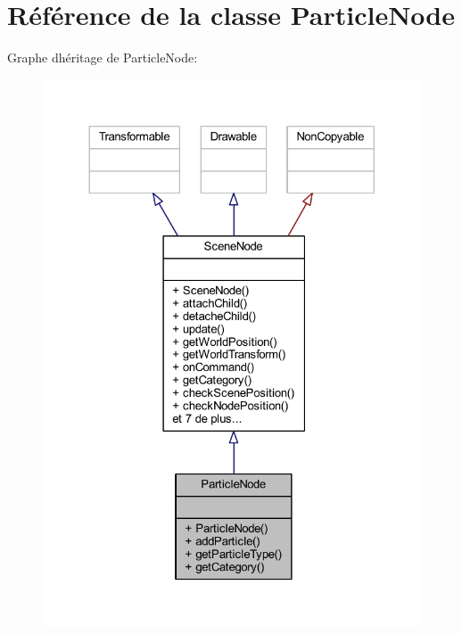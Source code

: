 \hypertarget{class_particle_node}{}\section{Référence de la classe Particle\+Node}
\label{class_particle_node}


Graphe d\textquotesingle{}héritage de Particle\+Node\+:\nopagebreak
\begin{figure}[H]
\begin{center}
\leavevmode
\includegraphics[width=324pt]{class_particle_node__inherit__graph}
\end{center}
\end{figure}


